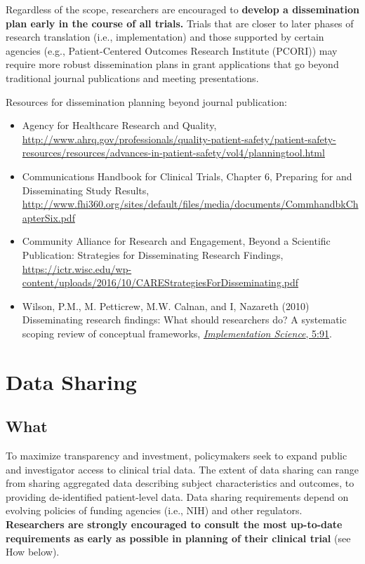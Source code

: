 \documentclass[]{book}
\providecommand{\tightlist}{%
  \setlength{\itemsep}{0pt}\setlength{\parskip}{0pt}}
\theoremstyle{definition}
\theoremstyle{definition}
\theoremstyle{definition}
\theoremstyle{remark}
\begin{document}
Regardless of the scope, researchers are encouraged to \textbf{develop a
dissemination plan early in the course of all trials.} Trials that are
closer to later phases of research translation (i.e., implementation)
and those supported by certain agencies (e.g., Patient-Centered Outcomes
Research Institute (PCORI)) may require more robust dissemination plans
in grant applications that go beyond traditional journal publications
and meeting presentations.

Resources for dissemination planning beyond journal publication:

\begin{itemize}
\tightlist
\item
  Agency for Healthcare Research and Quality,
  \url{http://www.ahrq.gov/professionals/quality-patient-safety/patient-safety-resources/resources/advances-in-patient-safety/vol4/planningtool.html}
\item
  Communications Handbook for Clinical Trials, Chapter 6, Preparing for
  and Disseminating Study Results,
  \url{http://www.fhi360.org/sites/default/files/media/documents/CommhandbkChapterSix.pdf}
\item
  Community Alliance for Research and Engagement, Beyond a Scientific
  Publication: Strategies for Disseminating Research Findings,
  \url{https://ictr.wisc.edu/wp-content/uploads/2016/10/CAREStrategiesForDisseminating.pdf}
\item
  Wilson, P.M., M. Petticrew, M.W. Calnan, and I, Nazareth (2010)
  Disseminating research findings: What should researchers do? A
  systematic scoping review of conceptual frameworks,
  \href{http://www.ncbi.nlm.nih.gov/pmc/articles/PMC2994786/}{\emph{Implementation
  Science}, 5:91}.
\end{itemize}

\section{Data Sharing}\label{data-sharing}

\subsection{What}\label{what-21}

To maximize transparency and investment, policymakers seek to expand
public and investigator access to clinical trial data. The extent of
data sharing can range from sharing aggregated data describing subject
characteristics and outcomes, to providing de-identified patient-level
data. Data sharing requirements depend on evolving policies of funding
agencies (i.e., NIH) and other regulators. \textbf{Researchers are
strongly encouraged to consult the most up-to-date requirements as early
as possible in planning of their clinical trial} (see How below).
\end{document}
